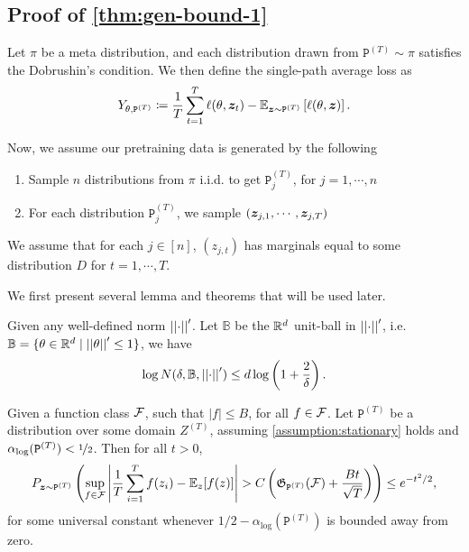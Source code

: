 \clearpage


\subsection{Proof of \cref{thm:gen-bound-1}}\label{proof:gen-bound-1}

Let $\pi$ be a meta distribution, and each distribution drawn from $ \mathtt{P}^{(T)} \sim \pi$ satisfies the Dobrushin's condition.
We then define the single-path average loss as
\[
Y_{\theta, \mathtt{P}^{(T)}}
\coloneqq
\frac{1}{T}
\sum_{t=1}^T
\ell( \theta, \bm{z}_t)
-
\mathbb{E}_{\bm{z} \sim \mathtt{P}^{(T)}}
\left[
\ell( \theta, \bm{z})
\right].
\]

Now, we assume our pretraining data is generated by the following
\begin{enumerate}
    \item Sample $n$ distributions from $\pi$ i.i.d. to get $\mathtt{P}^{(T)}_j$, for $j = 1,\cdots,n$
    \item For each distribution $\mathtt{P}^{(T)}_j$, we sample $(\bm{z}_{j,1}, \cdots, \bm{z}_{j,T})$
\end{enumerate}


\begin{assumption}\label{assumption:stationary}
    We assume that for each $j \in [n]$, $(z_{j, t})$ has marginals equal to some distribution $D$ for $t = 1, \cdots ,T$.
\end{assumption}

We first present several lemma and theorems that will be used later.
\begin{lemma}\label{lem:covering-number-unit-ball}
    Given any well-defined norm $\left\lvert \left\lvert\cdot\right\rvert \right\rvert^\prime$.
    Let $\mathbb{B}$ be the $\mathbb{R}^d$ unit-ball in $\left\lvert \left\lvert\cdot\right\rvert \right\rvert^\prime$, i.e. 
    $\mathbb{B} = \{ \theta \in \mathbb{R}^d \mid \left\lvert \left\lvert\theta\right\rvert \right\rvert^\prime \leq 1 \}$,
    we have
    \[
    \log N( \delta, \mathbb{B}, \left\lvert \left\lvert\cdot\right\rvert \right\rvert^\prime )
    \leq
    d 
    \log
    \left( 1 + \frac{2}{\delta} \right).
    \]
\end{lemma}

\begin{theorem}\label{thm:gen-bound-dobrushin}
    Given a function class $\mathcal{F}$, such that $\vert f \vert \leq B$, for all $f \in \mathcal{F}$.
    Let $\mathtt{P}^{(T)}$ be a distribution over some domain $Z^{(T)}$, assuming \cref{assumption:stationary} holds and $\alpha_{\log}( \mathtt{P}^{(T)} ) < \nicefrac{1}{2}$.
    Then for all $t > 0$,
    \[
    P_{\bm{z} \sim \mathtt{P}^{(T)}}
    \left(
    \sup_{f\in\mathcal{F}}
    \left\vert 
        \frac{1}{T}
        \sum_{i=1}^T
        f(z_i)
        -
        \mathbb{E}_{z}
        [
        f(z)
        ]
    \right\vert
    >
    C
    \left(
        \mathfrak{G}_{\mathtt{P}^{(T)}}( \mathcal{F})
        +
        \frac{B t}{\sqrt{T}}
    \right)
    \right)
    \leq
    e^{-t^2/2},
    \]
    for some universal constant whenever $1/2 - \alpha_{\log}(\mathtt{P}^{(T)})$ is bounded away from zero.
\end{theorem}

